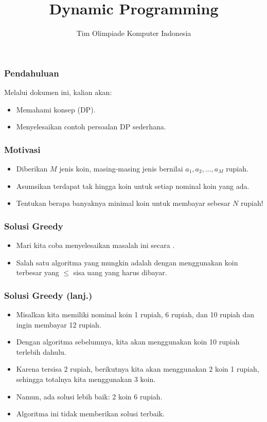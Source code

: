 

\title{Dynamic Programming}
\author{Tim Olimpiade Komputer Indonesia}
\date{}

\usepackage{qtree}


\begin{frame}
\titlepage
\end{frame}

\begin{frame}
\frametitle{Pendahuluan}
Melalui dokumen ini, kalian akan:
\begin{itemize}
  \item Memahami konsep  (DP).
  \item Menyelesaikan contoh persoalan DP sederhana.
\end{itemize}
\end{frame}

\begin{frame}
\frametitle{Motivasi}
\begin{itemize}
  \item Diberikan $M$ jenis koin, masing-masing jenis bernilai $a_1, a_2, ..., a_M$ rupiah.
  \item Asumsikan terdapat tak hingga koin untuk setiap nominal koin yang ada. 
  \item Tentukan berapa banyaknya minimal koin untuk membayar sebesar $N$ rupiah!
\end{itemize}
\end{frame}

\begin{frame}
\frametitle{Solusi Greedy}
\begin{itemize}
  \item Mari kita coba menyelesaikan masalah ini secara \fGreedy.
  \item Salah satu algoritma \fGreedy yang mungkin adalah dengan menggunakan koin terbesar yang $\leq$ sisa uang yang harus dibayar.
\end{itemize}
\end{frame}

\begin{frame}
\frametitle{Solusi Greedy (lanj.)}
\begin{itemize}
  \item Misalkan kita memiliki nominal koin 1 rupiah, 6 rupiah, dan 10 rupiah dan ingin membayar 12 rupiah.
  \item Dengan algoritma sebelumnya, kita akan menggunakan koin 10 rupiah terlebih dahulu. 
  \item Karena tersisa 2 rupiah, berikutnya kita akan menggunakan 2 koin 1 rupiah, sehingga totalnya kita menggunakan 3 koin.
  \item Namun, ada solusi lebih baik: 2 koin 6 rupiah.
  \item Algoritma \fGreedy ini tidak memberikan solusi terbaik.
\end{itemize}
\end{frame}

